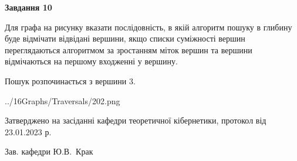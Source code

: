 \documentclass[12pt, ukrainian]{article}
\begin{document}
{\begin {large}
{\begin {center}\textbf{Завдання 10}\end {center}}\par
Для графа на рисунку вказати послідовність, в якій алгоритм пошуку в глибину буде відмічати відвідані вершини, якщо списки суміжності вершин переглядаються алгоритмом за зростанням міток вершин та вершини відмічаються на першому вход\-женні у вершину.\par
Пошук розпочинається з вершини 3.\par

\begin{center}
	{../16Graphs/Traversals/202.png}
\end{center}\par
\newpage


\end {large}
}
{\smallskip \begin {small} Затверджено на засіданні кафедри теоретичної кібернетики, протокол  від   23.01.2023 р.\par\smallskip\smallskip
{\parbox {6.5 cm}{Зав. кафедри \dotfill Ю.В.~Крак}} \end{small}}
\end{document}
